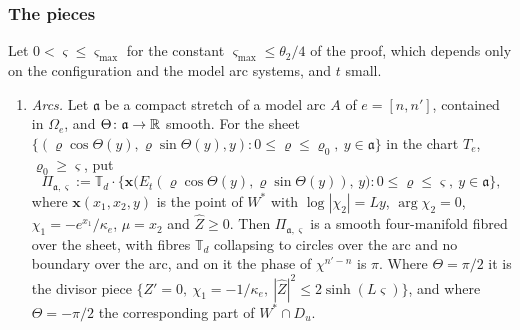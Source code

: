 \subsubsection*{The pieces}
\begin{lemma}\label{lem:pieces}
Let $0<\varsigma\le\varsigma_{\max}$ for the constant $\varsigma_{\max}\le\theta_2/4$ of the proof, which depends only on the
configuration and the model arc systems, and $t$ small.
\begin{enumerate}
\item \emph{Arcs.} Let $\mathfrak a$ be a compact stretch of a model arc $A$ of $e=[n,n']$, contained in $\Omega_e$, and
$\Theta\colon\mathfrak a\to\mathbb R$ smooth. For the sheet $\{(\varrho\cos\Theta(y),\varrho\sin\Theta(y),y):0\le\varrho\le\varrho_0,
\ y\in\mathfrak a\}$ in the chart $T_e$, $\varrho_0\ge\varsigma$, put
\[
\Pi_{\mathfrak a,\varsigma}:=\mathbb T_d\cdot\bigl\{\mathbf x\bigl(E_t(\varrho\cos\Theta(y),\varrho\sin\Theta(y)),\,y\bigr):
0\le\varrho\le\varsigma,\ y\in\mathfrak a\bigr\},
\]
where $\mathbf x(x_1,x_2,y)$ is the point of $W^*$ with $\log|\chi_2|=Ly$, $\arg\chi_2=0$, $\chi_1=-e^{x_1}/\kappa_e$,
$\hat\mu=x_2$ and $\hat Z\ge0$. Then $\Pi_{\mathfrak a,\varsigma}$ is a smooth four-manifold fibred over the sheet, with
fibres $\mathbb T_d$ collapsing to circles over the arc and no boundary over the arc, and on it the phase of
$\chi^{n'-n}$ is $\pi$. Where $\Theta=\pi/2$ it is the divisor piece $\{Z'=0,\ \chi_1=-1/\kappa_e,\ |\hat Z|^2\le
2\sinh(L\varsigma)\}$, and where $\Theta=-\pi/2$ the corresponding part of $W^*\cap D_u$.


\end{enumerate}
\end{lemma}
